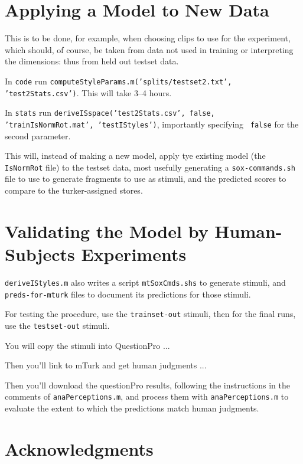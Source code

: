 \documentclass[11pt]{article}
\begin{document}
\section{Applying a Model to New Data}

This is to be done, for example, when choosing clips to use for the
experiment, which should, of course, be taken from data not used in
training or interpreting the dimensions: thus from held out testset
data.

In {\tt code} run {\tt computeStyleParams.m('splits/testset2.txt',
  'test2Stats.csv')}.  This will take  3--4 hours.

In {\tt stats} run {\tt deriveISspace('test2Stats.csv', false,
  'trainIsNormRot.mat', 'testIStyles')}, importantly specifying {\tt
  false} for the second parameter.

This will, instead of making a new model, apply tye existing model
(the {\tt IsNormRot} file) to the testset data, most usefully
generating a {\tt sox-commands.sh} file to use to generate fragments
to use as stimuli, and the predicted scores to compare to the
turker-assigned stores.


\section{Validating the Model by Human-Subjects Experiments}

{\tt deriveIStyles.m} also writes a script {\tt mtSoxCmds.shs} to generate
stimuli, and {\tt preds-for-mturk} files to document its predictions
for those stimuli.  

For testing the procedure, use the {\tt trainset-out} stimuli, then
for the final runs, use the {\tt testset-out} stimuli.

You will copy the stimuli into QuestionPro ...

Then you'll link to mTurk and get human judgments ...

Then you'll download the questionPro results, following the
instructions in the comments of {\tt anaPerceptions.m}, and process
them with {\tt anaPerceptions.m} to evaluate the extent to which the predictions match human judgments. 



\section{Acknowledgments }  



%

\end{document}

